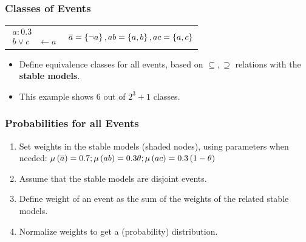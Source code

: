 \documentclass[bigger,xcolor={x11names,svgnames}]{beamer}
\newcommand{\co}[1]{\ensuremath{\overline{#1}}}
\newcommand{\probfact}[2]{\ensuremath{#2:#1}}
\begin{document}
%
\begin{frame}
    \frametitle{Classes of Events}
    \small

    \vfill
    \begin{center}
        \diagram
    \end{center}

    \vfill
    \begin{center}
        \begin{tabular}{lr}
            $\begin{aligned}
                     \probfact{0.3}{a}       \\
                     b \vee c & \leftarrow a
                 \end{aligned}$
             &
            $\co{a} = \set{\neg a}, ab = \set{a, b}, ac = \set{a, c}$
        \end{tabular}
    \end{center}

    \vfill
    \begin{itemize}
        \item Define \alert{equivalence classes} for all events, based on $\subseteq, \supseteq$ relations with the \textbf{stable models}.
        \item This example shows $6$ out of $2^3 + 1$ classes.
    \end{itemize}
\end{frame}
%
\begin{frame}
    \frametitle{Probabilities for all Events}
    \vfill
    \begin{center}
        \diagram
    \end{center}
    \vfill
    \footnotesize
    \begin{enumerate}
        \item Set \alert{weights} in the stable models (shaded nodes), using parameters when needed: $\mu\del{\co{a}} = 0.7; \mu\del{ab} = 0.3\theta; \mu\del{ac}=0.3\del{1 - \theta}$
        \item Assume that the stable models are \alert{disjoint events}.
        \item Define \alert{weight of an event} as the sum of the weights of the related stable models.
        \item Normalize weights to get a (probability) \alert{distribution}.
    \end{enumerate}
\end{frame}
\end{document}

